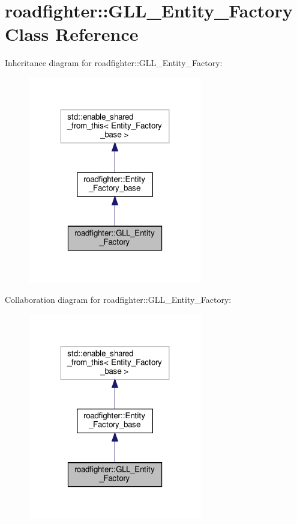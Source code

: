 \hypertarget{classroadfighter_1_1GLL__Entity__Factory}{}\section{roadfighter\+:\+:G\+L\+L\+\_\+\+Entity\+\_\+\+Factory Class Reference}
\label{classroadfighter_1_1GLL__Entity__Factory}


Inheritance diagram for roadfighter\+:\+:G\+L\+L\+\_\+\+Entity\+\_\+\+Factory\+:\nopagebreak
\begin{figure}[H]
\begin{center}
\leavevmode
\includegraphics[width=215pt]{classroadfighter_1_1GLL__Entity__Factory__inherit__graph}
\end{center}
\end{figure}


Collaboration diagram for roadfighter\+:\+:G\+L\+L\+\_\+\+Entity\+\_\+\+Factory\+:\nopagebreak
\begin{figure}[H]
\begin{center}
\leavevmode
\includegraphics[width=215pt]{classroadfighter_1_1GLL__Entity__Factory__coll__graph}
\end{center}
\end{figure}
